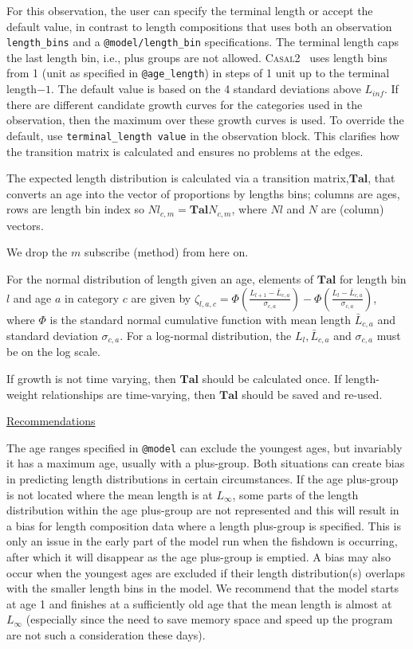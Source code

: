 \documentclass[a4paper,11pt,twoside,pdftex,draft]{article}
\newcommand{\CNAME}{\textsc{Casal2}}
\begin{document}
For this observation, the user can specify the terminal length or accept the default value, in contrast to length compositions that uses both an observation \texttt{length\_bins} and a  \texttt{@model/length\_bin}  specifications. The terminal length caps the last length bin, i.e., plus groups are not allowed. \CNAME~ uses length bins from 1 (unit as specified in \texttt{@age\_length}) in steps of 1 unit up to the terminal length$ - 1$. The default value is based on the  4 standard deviations above $L_{inf}$. If there are different candidate growth curves for the categories used in the observation, then the maximum over these growth curves is used. To override the default, use \texttt{terminal\_length  value} in the observation block.
This clarifies how the transition matrix is calculated and ensures no problems at the edges. 

The expected length distribution is calculated via 
a transition matrix,$\mathbf{Tal}$, that converts an age into the vector of proportions by lengths bins; columns are ages, rows are length bin index so $Nl_{c,m} = \mathbf{Tal} N_{c,m}$, where $Nl$ and $N$ are (column) vectors.

We drop the $m$ subscribe (method) from here on.



For the normal distribution of length given an age, 
elements of $\mathbf{Tal}$ for length bin $l$ and age $a$ in category $c$ are given by $\zeta_{l,a,c} = \Phi\left( \frac{L_{l+1} - \bar L_{c,a}   }{\sigma_{c,a}} \right)   - \Phi\left( \frac{L_{l} - \bar L_{c,a}   }{\sigma_{c,a}} \right)  $,
where $\Phi$ is the standard normal cumulative function with mean length $\bar L_{c,a}$ and standard deviation $\sigma_{c,a}$. For a log-normal distribution, the $L_{l}, \bar L_{c,a}$ and $\sigma_{c,a}$ must be on the log scale.


If growth is not time varying, then $\mathbf{Tal}$ should be calculated once. If length-weight relationships are time-varying, then $\mathbf{Tal}$ should be saved and re-used.

\bigskip
\underline{Recommendations}

The age ranges specified in \texttt{@model} can exclude the youngest ages, but invariably it has a maximum age, usually with a plus-group. Both situations can create bias in predicting length distributions in certain circumstances.  If the age plus-group is not located where the mean length is at $L_{\infty}$, some parts of the length distribution within the age plus-group are not represented and this will result in a bias for length composition data where a length plus-group is specified. This is only an issue in the early part of the model run when the fishdown is occurring, after which it will disappear as the age plus-group is emptied.  A bias may also occur when the youngest ages are excluded if their length distribution(s) overlaps with the smaller length bins in the model. We recommend that the model starts at age 1 and finishes at a sufficiently old age that the mean length is almost at $L_{\infty}$ (especially since the need to save memory space and speed up the  program are not such a consideration these days). 
\end{document}
